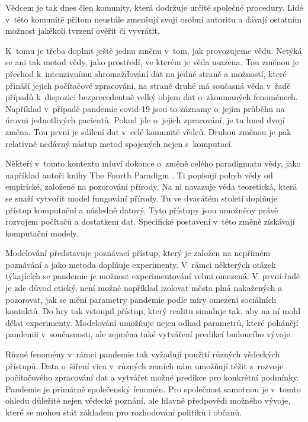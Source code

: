 Vědcem je tak dnes člen komunity, která dodržuje určité společné procedury. Lidé v~této komunitě přitom neustále zmenšují svoji osobní autoritu a dávají ostatním možnost jakékoli tvrzení ověřit či vyvrátit.

K~tomu je třeba doplnit ještě jednu změnu v~tom, jak provozujeme vědu. Netýká se ani tak metod vědy, jako prostředí, ve kterém je věda usazena. Tou změnou je přechod k~intenzivnímu shromažďování dat na jedné straně a možností, které přináší jejich počítačové zpracování, na straně druhé má současná věda v~řadě případů k~dispozici bezprecedentně velký objem dat o~zkoumaných fenoménech. Například v~případě pandemie covid-19 jsou to záznamy o~jejím průběhu na úrovni jednotlivých pacientů. Pokud jde o~jejich zpracování, je tu hned dvojí změna. Tou první je sdílení dat v~celé komunitě vědců. Druhou změnou je pak relativně nedávný nástup metod spojených nejen s~komputací.

Někteří v~tomto kontextu mluví dokonce o~změně celého paradigmatu vědy, jako například autoři knihy The Fourth Paradigm \cite{Hey2009}. Ti popisují pohyb vědy od empirické, založené na pozorování přírody. Na ni navazuje věda teoretická, která se snaží vytvořit model fungování přírody.  Tu ve dvacátém století doplňuje přístup komputační a následně datový. Tyto přístupy jsou umožněny právě rozvojem počítačů a dostatkem dat. Specifické postavení v~této změně získávají komputační modely.

Modelování představuje poznávací přístup, který je založen na nepřímém poz\-ná\-vá\-ní a jako metoda doplňuje experimenty. V~rámci některých otázek týkajících se pandemie je možnost experimentování velmi omezená. V~první řadě je zde důvod etický, není možné například izolovat města plná nakažených a pozorovat, jak se mění parametry pandemie podle míry omezení sociálních kontaktů. Do hry tak vstoupil přístup, který realitu simuluje tak, aby na ní mohl dělat experimenty. Modelování umožňuje nejen odhad parametrů, které pohánějí pandemii v~současnosti, ale zejména také vytváření predikcí budoucího vývoje.

Různé fenomény v~rámci pandemie tak vyžadují použití různých vědeckých pří\-stu\-pů. Data o~šíření viru v~různých zemích nám umožňují těžit z~rozvoje počítačového zpracování dat
a vytvářet možné predikce pro konkrétní podmínky. Pandemie je primárně společenský fenomén. Pro společnost samotnou je v~tomto ohledu důležité nejen vědecké poznání, ale hlavně předpovědi možného vývoje, které se mohou stát základem pro rozhodování politiků i občanů.

